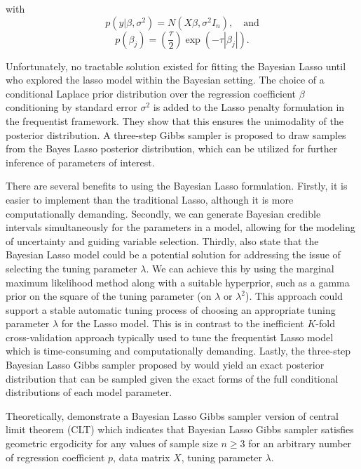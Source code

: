 \noindent with
\begin{equation}
	\label{eq:lassolikelihood}
	p(y |\beta,\sigma^2) = N(X\beta,\sigma^2I_n), \quad \mbox{and}
\end{equation}
\begin{equation}
	\label{eq:LassoPrior}
	p(\beta_j) = \left(\frac{\tau}{2}\right) \exp(-\tau|\beta_j|).
\end{equation}

Unfortunately, no tractable solution existed for fitting the Bayesian Lasso until \cite{park_casella_2008}
who explored the lasso model within the Bayesian setting. The choice of a conditional Laplace prior distribution over the regression coefficient $\beta$ conditioning by standard error $\sigma^2$ is added to the Lasso penalty formulation in the frequentist framework. They show that this ensures the unimodality of the posterior distribution. A three-step Gibbs sampler is proposed to draw samples from the Bayes Lasso posterior distribution, which can be utilized for further inference of parameters of interest.

There are several benefits to using the Bayesian Lasso formulation. Firstly, it is easier to implement than the traditional Lasso, although it is more computationally demanding. Secondly, we can generate Bayesian credible intervals simultaneously for the parameters in a model, allowing for the modeling of uncertainty and guiding variable selection.
Thirdly, \cite{park_casella_2008} also state that the Bayesian Lasso model could be a potential solution for addressing the issue of selecting the tuning parameter $\lambda$. We can achieve this by using the marginal maximum likelihood method along with a suitable hyperprior, such as a gamma prior on the square of the tuning parameter (on $\lambda$ or $\lambda^2$).
This approach could support a stable automatic tuning process of choosing an appropriate tuning parameter $\lambda$ for the Lasso model. This is in contrast to the inefficient $K$-fold cross-validation approach typically used to tune the frequentist Lasso model which is time-consuming and computationally demanding. Lastly, the three-step Bayesian Lasso Gibbs sampler proposed by \cite{park_casella_2008} would yield an exact posterior distribution that can be sampled given the exact forms of the full conditional distributions of each model parameter. 

Theoretically, \cite{khare_hobert_2013} demonstrate a Bayesian Lasso Gibbs sampler version of central limit theorem (CLT) which indicates that Bayesian Lasso Gibbs sampler satisfies geometric ergodicity for any values of sample size $n \geq 3$ for an arbitrary number of regression coefficient $p$, data matrix $X$, tuning parameter $\lambda$. 

